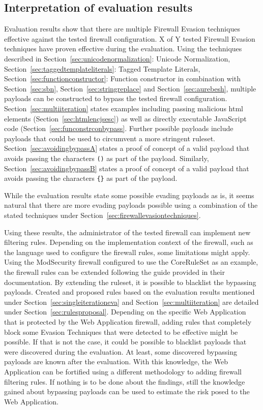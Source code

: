 \subsection{Interpretation of evaluation results}
Evaluation results show that there are multiple Firewall Evasion techniques effective against the tested firewall configuration. {\color{red}X of Y} tested Firewall Evasion techniques have proven effective during the evaluation. Using the techniques described in Section~\ref{sec:unicodenormalization}: Unicode Normalization, Section~\ref{sec:taggedtemplateliterals}: Tagged Template Literals, Section~\ref{sec:functionconstructor}: Function constructor in combination with Section~\ref{sec:sbn}, Section~\ref{sec:stringreplace} and Section~\ref{sec:aurebesh}, multiple payloads can be constructed to bypass the tested firewall configuration. Section~\ref{sec:multiiteration} states examples including passing malicious html elements (Section~\ref{sec:htmlencjsesc}) as well as directly executable JavaScript code (Section~\ref{sec:funconstrconbypass}. 
Further possible payloads include payloads that could be used to circumvent a more stringent ruleset.
Section~\ref{sec:avoidingbypassA} states a proof of concept of a valid payload that avoids passing the characters \verb|()| as part of the payload.
Similarly, Section~\ref{sec:avoidingbypassB} states a proof of concept of a valid payload that avoids passing the characters \verb|{}| as part of the payload. 

While the evaluation results state some possible evading payloads as is, it seems natural that there are more evading payloads possible using a combination of the stated techniques under Section~\ref{sec:firewallevasiontechniques}.

Using these results, the administrator of the tested firewall can implement new filtering rules. Depending on the implementation context of the firewall, such as the language used to configure the firewall rules, some limitations might apply. Using the ModSecurity firewall configured to use the CoreRuleSet as an example, the firewall rules can be extended following the guide provided in their documentation. By extending the ruleset, it is possible to blacklist the bypassing payloads. Created and proposed rules based on the evaluation results mentioned under Section~\ref{sec:singleiterationeva} and Section~\ref{sec:multiiteration} are detailed under Section~\ref{sec:rulesproposal}. Depending on the specific Web Application that is protected by the Web Application firewall, adding rules that completely block some Evasion Techniques that were detected to be effective might be possible. If that is not the case, it could be possible to blacklist payloads that were discovered during the evaluation. At least, some discovered bypassing payloads are known after the evaluation. With this knowledge, the Web Application can be fortified using a different methodology to adding firewall filtering rules. If nothing is to be done about the findings, still the knowledge gained about bypassing payloads can be used to estimate the risk posed to the Web Application. 


